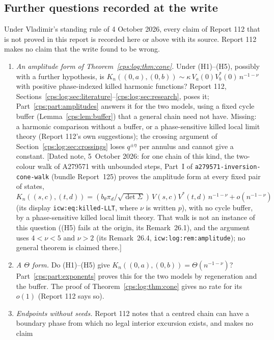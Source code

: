 \documentclass[11pt,letterpaper]{article}
\numberwithin{equation}{section}
\theoremstyle{remark}\newtheorem{remark}[theorem]{Remark}
\newcommand{\repo}[1]{\nolinkurl{#1}}
\begin{document}
\begin{enumerate}
\subsection{Further questions recorded at the write}\label{cps:log:sec:questions}
Under Vladimir's standing rule of 4 October 2026, every claim of Report 112 that is not proved
in this report is recorded here or above with its source. Report 112 makes no claim that the
write found to be wrong.
\begin{enumerate}[label=\textup{Q\arabic*.},ref=Q\arabic*]
\item\label{cps:log:q:amplitude} \emph{An amplitude form of Theorem~\ref{cps:log:thm:cone}.} Under
 (H1)--(H5), possibly with a further hypothesis, is
 $K_n((0,a),(0,b))\sim\kappa\,V_a(0)V^*_b(0)\,n^{-1-\nu}$ with positive phase-indexed killed harmonic
 functions? Report 112, Sections~\ref{cps:log:sec:literature}--\ref{cps:log:sec:research}, poses
 it; Part~\ref{cps:part:amplitudes} answers it for the two models, using a fixed cycle buffer
 (Lemma~\ref{cps:lem:buffer}) that a general chain need not have. Missing: a harmonic comparison
 without a buffer, or a phase-sensitive killed local limit theory (Report 112's own
 suggestions); the crossing argument of Section~\ref{cps:log:sec:crossings} loses $q^{\pm\eta}$
 per annulus and cannot give a constant.
 \textup{[}Dated note, 5~October 2026: for one chain of this kind, the two-colour walk of A279571
 with unbounded steps, Part~I of \repo{a279571-inversion-cone-walk} (bundle Report~125) proves the
 amplitude form at every fixed pair of states,
 $K_n((s,c),(t,d))=(b_\theta\pi_d/\sqrt{\det\Sigma})\,V(s,c)V^*(t,d)\,n^{-1-\nu}+o(n^{-1-\nu})$
 (its display \texttt{icw:eq:killed-LLT}, where $\nu$ is written $p$), with no cycle buffer, by a
 phase-sensitive killed local limit theory. That walk is not an instance of this question ((H5)
 fails at the origin, its Remark~26.1), and the argument uses $4<\nu<5$ and $\nu>2$ (its
 Remark~26.4, \texttt{icw:log:rem:amplitude}); no general theorem is claimed there.\textup{]}
\item\label{cps:log:q:theta} \emph{A $\Theta$ form.} Do (H1)--(H5) give
 $K_n((0,a),(0,b))=\Theta(n^{-1-\nu})$? Part~\ref{cps:part:exponents} proves this for the two
 models by regeneration and the buffer. The proof of Theorem~\ref{cps:log:thm:cone} gives no rate
 for its $o(1)$ (Report 112 says so).
\item\label{cps:log:q:seeds} \emph{Endpoints without seeds.} Report 112 notes that a centred chain
 can have a boundary phase from which no legal interior excursion exists, and makes no claim

\end{enumerate}
\end{enumerate}
\end{document}
